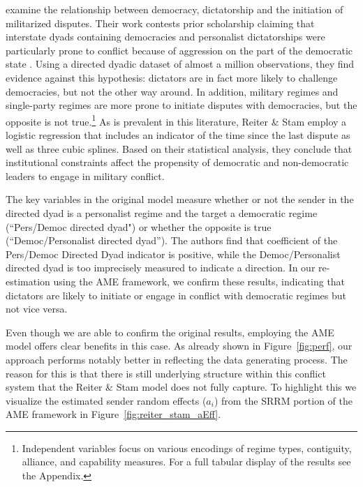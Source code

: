 \citet{reiter:stam:2003} examine the relationship between democracy, dictatorship and the initiation of militarized disputes. Their work contests prior scholarship claiming that interstate dyads containing democracies and personalist dictatorships were particularly prone to conflict because of aggression on the part of the democratic state \citep{peceny:etal:2002}. Using a directed dyadic dataset of almost a million observations, they find evidence against this hypothesis: dictators are in fact more likely to challenge democracies, but not the other way around. In addition, military regimes and single-party regimes are more prone to initiate disputes with democracies, but the opposite is not true.\footnote{Independent variables focus on various encodings of regime types, contiguity, alliance, and capability measures. For a full tabular display of the results see the Appendix.} As is prevalent in this literature, Reiter \& Stam employ a logistic regression that includes an indicator of the time since the last dispute as well as three cubic splines. Based on their statistical analysis, they conclude that institutional constraints affect the propensity of democratic and non-democratic leaders to engage in military conflict.

The key variables in the original model measure whether or not the sender in the directed dyad is a personalist regime and the target a democratic regime (``Pers/Democ directed dyad") or whether the opposite is true (``Democ/Personalist directed dyad''). The authors find that coefficient of the Pers/Democ Directed Dyad indicator is positive, while the Democ/Personalist directed dyad is too imprecisely measured to indicate a direction. In our re-estimation using the AME framework, we confirm these results, indicating that dictators are likely to initiate or engage in conflict with democratic regimes but not vice versa.

Even though we are able to confirm the original results, employing the AME model offers clear benefits in this case. As already shown in Figure~\ref{fig:perf}, our approach performs notably better in reflecting the data generating process. The reason for this is that there is still underlying structure within this conflict system that the Reiter \& Stam model does not fully capture. To highlight this we visualize the estimated sender random effects ($a_{i}$) from the SRRM portion of the AME framework in Figure~\ref{fig:reiter_stam_aEff}.

